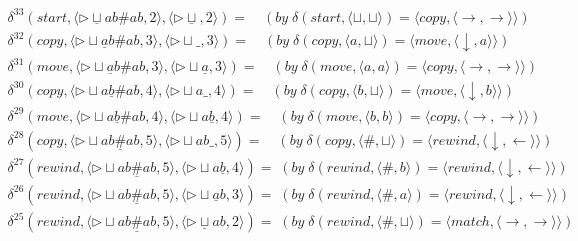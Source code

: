 \documentclass[14pt]{extarticle}
\begin{document}
\begin{align*}
    \delta^{33}(start, \langle \triangleright \underline{\sqcup} ab \# ab, 2 \rangle, \langle \triangleright \underline{\sqcup}, 2 \rangle) = \quad (by\; \delta(start, \langle \sqcup, \sqcup \rangle) = \langle copy, \langle \rightarrow, \rightarrow \rangle \rangle) \\
    \delta^{32}(copy, \langle \triangleright \sqcup \underline{a}b \# ab, 3 \rangle, \langle \triangleright \sqcup \_, 3 \rangle) = \quad (by\; \delta(copy, \langle a, \sqcup \rangle) = \langle move, \langle \downarrow, a \rangle \rangle ) \\
    \delta^{31}(move, \langle \triangleright \sqcup \underline{a}b \# ab, 3 \rangle, \langle \triangleright \sqcup \underline{a}, 3 \rangle) = \quad (by\; \delta(move, \langle a, a \rangle) = \langle copy, \langle \rightarrow, \rightarrow \rangle \rangle ) \\
    \delta^{30}(copy, \langle \triangleright \sqcup a\underline{b} \# ab, 4 \rangle, \langle \triangleright \sqcup a \_, 4 \rangle) = \quad (by\; \delta(copy, \langle b, \sqcup \rangle) = \langle move, \langle \downarrow, b \rangle \rangle ) \\
    \delta^{29}(move, \langle \triangleright \sqcup a\underline{b}\# ab, 4 \rangle, \langle \triangleright \sqcup a\underline{b}, 4 \rangle) = \quad (by\; \delta(move, \langle b, b \rangle) = \langle copy, \langle \rightarrow, \rightarrow \rangle \rangle ) \\
    \delta^{28}(copy, \langle \triangleright \sqcup ab\underline{\#} ab, 5 \rangle, \langle \triangleright \sqcup ab\_, 5 \rangle) = \quad (by\; \delta(copy, \langle \#, \sqcup \rangle) = \langle rewind, \langle \downarrow, \leftarrow \rangle \rangle ) \\
    \delta^{27}(rewind, \langle \triangleright \sqcup ab\underline{\#} ab, 5 \rangle, \langle \triangleright \sqcup a\underline{b}, 4 \rangle) = \; (by\; \delta(rewind, \langle \#, b \rangle) = \langle rewind, \langle \downarrow, \leftarrow \rangle \rangle ) \\
    \delta^{26}(rewind, \langle \triangleright \sqcup ab\underline{\#} ab, 5 \rangle, \langle \triangleright \sqcup \underline{a}b, 3 \rangle) = \; (by\; \delta(rewind, \langle \#, a \rangle) = \langle rewind, \langle \downarrow, \leftarrow \rangle \rangle ) \\
    \delta^{25}(rewind, \langle \triangleright \sqcup ab\underline{\#} ab, 5 \rangle, \langle \triangleright \underline{\sqcup} ab, 2 \rangle) = \; (by\; \delta(rewind, \langle \#, \sqcup \rangle) = \langle match, \langle \rightarrow, \rightarrow \rangle \rangle ) \\

\end{align*}
\end{document}
